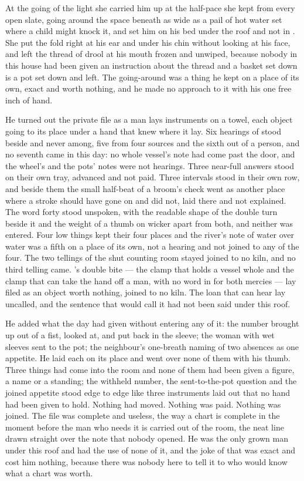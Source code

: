 \scenebreak

At the going of the light she carried him up at the half-pace she kept from every open slate, going around the space beneath  as wide as a pail of hot water set where a child might knock it, and set him on his bed under the roof and not in . She put the fold right at his ear and under his chin without looking at his face, and left the thread of drool at his mouth frozen and unwiped, because nobody in this house had been given an instruction about the thread and a basket set down is a pot set down and left. The going-around was a thing he kept on a place of its own, exact and worth nothing, and he made no approach to it with his one free inch of hand.

He turned out the private file as a man lays instruments on a towel, each object going to its place under a hand that knew where it lay. Six hearings of  stood beside and never among, five from four sources and the sixth out of a person, and no seventh came in this day: no whole vessel's note had come past the door, and the wheel's and the pots' notes were not hearings. Three near-full answers stood on their own tray, advanced and not paid. Three intervals stood in their own row, and beside them the small half-beat of a broom's check went as another place where a stroke should have gone on and did not, laid there and not explained. The word forty stood unspoken, with the readable shape of the double turn beside it and the weight of a thumb on wicker apart from both, and neither was entered. Four low things kept their four places and the river's note of water over water was a fifth on a place of its own, not a hearing and not joined to any of the four. The two tellings of the shut counting room stayed joined to no kiln, and no third telling came. 's double bite --- the clamp that holds a vessel whole and the clamp that can take the hand off a man, with no word in  for both mercies --- lay filed as an object worth nothing, joined to no kiln. The loan that can hear lay uncalled, and the sentence that would call it had not been said under this roof.

He added what the day had given without entering any of it: the number brought up out of a fist, looked at, and put back in the sleeve; the woman with wet sleeves sent to the pot; the neighbour's one-breath naming of two absences as one appetite. He laid each on its place and went over none of them with his thumb. Three things had come into the room and none of them had been given a figure, a name or a standing; the withheld number, the sent-to-the-pot question and the joined appetite stood edge to edge like three instruments laid out that no hand had been given to hold. Nothing had moved. Nothing was paid. Nothing was joined. The file was complete and useless, the way a chart is complete in the moment before the man who needs it is carried out of the room, the neat line drawn straight over the note that nobody opened. He was the only grown man under this roof and had the use of none of it, and the joke of that was exact and cost him nothing, because there was nobody here to tell it to who would know what a chart was worth.

